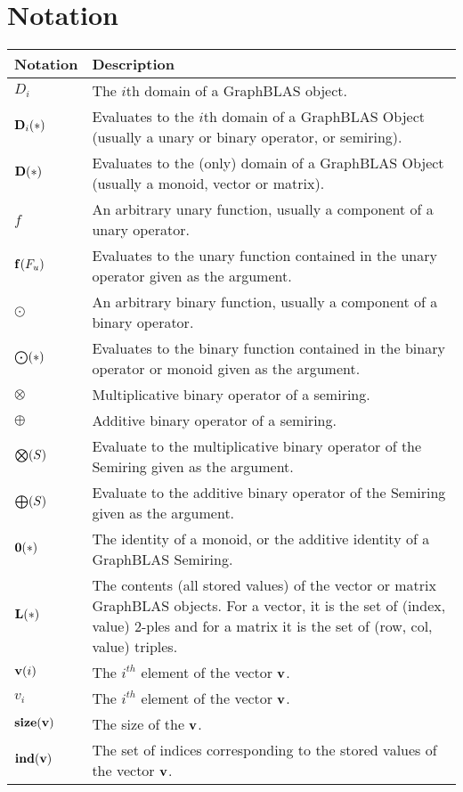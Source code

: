 \section{Notation}

\begin{tabular}{l|p{5in}}
Notation & Description \\
\hline
$D_i$           & The $i$th domain of a GraphBLAS object. \\
$\bold{D}_i(*)$ & Evaluates to the $i$th domain of a GraphBLAS Object (usually a unary or binary operator, or semiring). \\
$\bold{D}(*)$   & Evaluates to the (only) domain of a GraphBLAS Object (usually a monoid, vector or matrix). \\ 
$f$             & An arbitrary unary function, usually a component of a unary operator. \\
$\bold{f}(F_u)$ & Evaluates to the unary function contained in the unary operator given as the argument. \\
$\odot$         & An arbitrary binary function, usually a component of a binary operator. \\
$\bold{\bigodot}(*)$ & Evaluates to the binary function contained in the binary operator or monoid given as the argument. \\
$\otimes$       & Multiplicative binary operator of a semiring. \\
$\oplus$        & Additive binary operator of a semiring. \\
$\bold{\bigotimes}(S)$ & Evaluate to the multiplicative binary operator of the Semiring given as the argument. \\
$\bold{\bigoplus}(S)$ & Evaluate to the additive binary operator of the Semiring given as the argument. \\
$\bold{0}(*)$   & The identity of a monoid, or the additive identity of a GraphBLAS Semiring. \\
$\bold{L}(*)$   & The contents (all stored values) of the vector or matrix GraphBLAS objects.  For a vector, it is the set of (index, value) 2-ples and for a matrix it is the set of (row, col, value) triples. \\
$\bold{v}(i)$   & The $i^{th}$ element of the vector ${\bf v}$.\\
$v_i$           & The $i^{th}$ element of the vector ${\bf v}$.\\
$\bold{size}({\bf v})$ & The size of the ${\bf v}$.\\
$\bold{ind}({\bf v})$ & The set of indices corresponding to the stored values of the vector ${\bf v}$.\\

\end{tabular}
